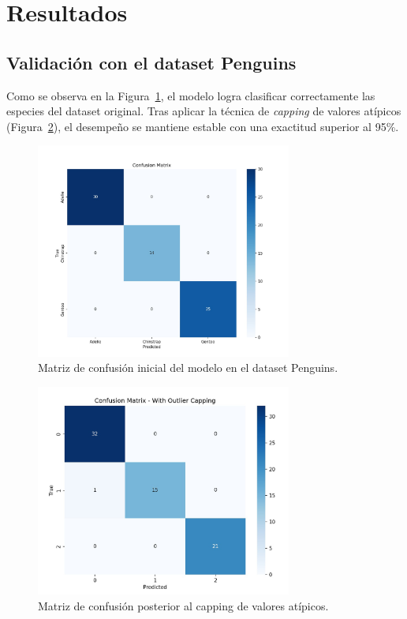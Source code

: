 \documentclass[12pt]{article}
\begin{document}
\section{Resultados}

\subsection{Validación con el dataset Penguins}
Como se observa en la Figura~\ref{fig:penguins-cm}, el modelo logra clasificar correctamente las especies del dataset original.  
Tras aplicar la técnica de \textit{capping} de valores atípicos (Figura~\ref{fig:penguins-cap}), el desempeño se mantiene estable con una exactitud superior al 95\%.

\begin{figure}[H]
\centering
\includegraphics[width=0.75\textwidth]{figures/penguins_confusion_matrix.png}
\caption{Matriz de confusión inicial del modelo en el dataset Penguins.}
\label{fig:penguins-cm}
\end{figure}

\begin{figure}[H]
\centering
\includegraphics[width=0.75\textwidth]{figures/penguins_outlier_capping.png}
\caption{Matriz de confusión posterior al capping de valores atípicos.}
\label{fig:penguins-cap}
\end{figure}
\end{document}
